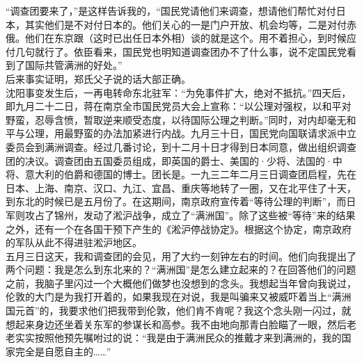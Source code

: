 “调查团要来了，”是这样告诉我的，“国民党请他们来调查，想请他们帮忙对付日本，其实他们是不对付日本的。他们关心的一是门户开放、机会均等，二是对付赤俄。他们在东京跟（这时已出任日本外相）谈的就是这个。用不着担心，到时候应付几句就行了。依臣看来，国民党也明知道调查团办不了什么事，说不定国民党看到了国际共管满洲的好处。”\\

后来事实证明，郑氏父子说的话大部正确。\\

沈阳事变发生后，一再电转命东北驻军：“为免事件扩大，绝对不抵抗。”四天后，即九月二十二日，蒋在南京全市国民党员大会上宣称：“以公理对强权，以和平对野蛮，忍辱含愤，暂取逆来顺受态度，以待国际公理之判断。”同时，对内却毫无和平与公理，用最野蛮的办法加紧进行内战。九月三十日，国民党向国联请求派中立委员会到满洲调查。经过几番讨论，到十二月十日才得到日本同意，做出组织调查团的决议。调查团由五国委员组成，即英国的爵士、美国的·少将、法国的·中将、意大利的伯爵和德国的博士。团长是。一九三二年二月三日调查团启程，先在日本、上海、南京、汉口、九江、宜昌、重庆等地转了一圈，又在北平住了十天，到东北的时候已是五月份了。在这期间，南京政府宣传着“等待公理的判断”，而日军则攻占了锦州，发动了淞沪战争，成立了“满洲国”。除了这些被“等待”来的结果之外，还有一个在各国干预下产生的《淞沪停战协定》。根据这个协定，南京政府的军队从此不得进驻淞沪地区。\\

五月三日这天，我和调查团的会见，用了大约一刻钟左右的时间。他们向我提出了两个问题：我是怎么到东北来的？“满洲国”是怎么建立起来的？在回答他们的问题之前，我脑子里闪过一个大概他们做梦也没想到的念头。我想起当年曾向我说过，伦敦的大门是为我打开着的，如果我现在对说，我是叫骗来又被威吓着当上“满洲国元首”的，我要求他们把我带到伦敦，他们肯不肯呢？我这个念头刚一闪过，就想起来身边还坐着关东军的参谋长和高参。我不由地向那青白脸瞄了一眼，然后老老实实按照他预先嘱咐过的说：“我是由于满洲民众的推戴才来到满洲的，我的国家完全是自愿自主的……”\\

